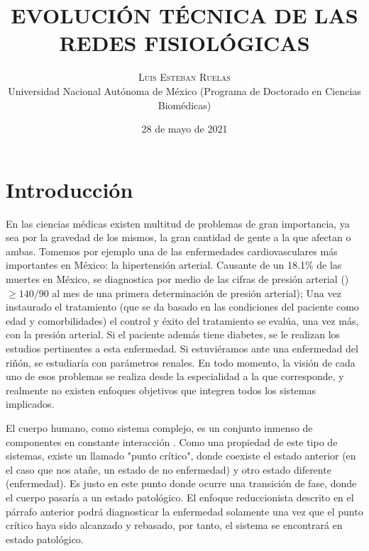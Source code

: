 \documentclass[twoside,twocolumn]{article}
\title{EVOLUCIÓN TÉCNICA DE LAS REDES FISIOLÓGICAS} %
\author{%
\textsc{Luis Esteban Ruelas} \\[1ex] %
\normalsize Universidad Nacional Autónoma de México
 (Programa de Doctorado en Ciencias Biomédicas)\\ %
}
\date{28 de mayo de 2021} %
\begin{document}
\renewcommand{\abstractname}{Resumen}
\renewcommand{\figurename}{Figura}
\maketitle


\section{Introducción}
En las ciencias médicas existen multitud de problemas de gran importancia, ya sea por la gravedad de los mismos, la gran cantidad de gente a la que afectan o ambas.
Tomemos por ejemplo una de las enfermedades cardiovasculares más importantes en México: la hipertensión arterial.
Causante de un 18.1\% de las muertes en México\cite{campos2018hipertension}, se diagnostica por medio de las cifras de presión arterial ()$\geq140/90$ al mes de una primera determinación de presión arterial\cite{de2008diagnostico});
Una vez instaurado el tratamiento (que se da basado en las condiciones del paciente como edad y comorbilidades) el control y éxito del tratamiento se evalúa, una vez más, con la presión arterial.
Si el paciente además tiene diabetes, se le realizan los estudios pertinentes a esta enfermedad. Si estuviéramos ante una enfermedad del riñón, se estudiaría con parámetros renales. En todo momento, la visión de cada uno de esos problemas se realiza desde la especialidad a la que corresponde, y realmente no existen enfoques objetivos que integren todos los sistemas implicados.

El cuerpo humano, como sistema complejo\cite{mobus2015principles}, es un conjunto inmenso de componentes en constante interacción \cite{engel2010thermodynamics}.
Como una propiedad de este tipo de sistemas, existe un llamado "punto crítico", donde coexiste el estado anterior (en el caso que nos atañe, un estado de no enfermedad) y otro estado diferente (enfermedad).
Es justo en este punto donde ocurre una transición de fase, donde el cuerpo pasaría a un estado patológico.
El enfoque reduccionista descrito en el párrafo anterior podrá diagnosticar la enfermedad solamente una vez que el punto crítico haya sido alcanzado y rebasado, por tanto, el sistema se encontrará en estado patológico.
\end{document}
